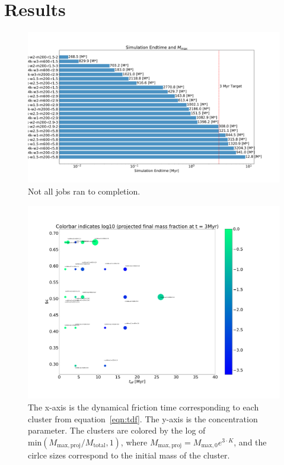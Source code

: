 \documentclass{princeton_astro_thesis}
\numberwithin{equation}{section}
\begin{document}
\chapter{Results} \label{ch:Results}

\begin{figure}
    \centering
    \includegraphics{JobProgress}
    \caption{Not all jobs ran to completion. }
    \label{fig:JobProgress}
\end{figure}

\begin{figure}
    \centering
    \includegraphics[width=1.3\textwidth]{kplot}
    \caption{The x-axis is the dynamical friction time corresponding to each cluster from equation~\ref{eqn:tdf}.  The y-axis is the concentration parameter.  The clusters are colored by the log of $\mathrm{min}(M_{\mathrm{max, proj}}/M_{\mathrm{total}}, 1)$, where $M_{\mathrm{max, proj}} = M_{\mathrm{max}, 0}e^{3 \cdot K}$, and the cirlce sizes correspond to the initial mass of the cluster.}
    \label{fig:Kplot}
\end{figure}
\end{document}
